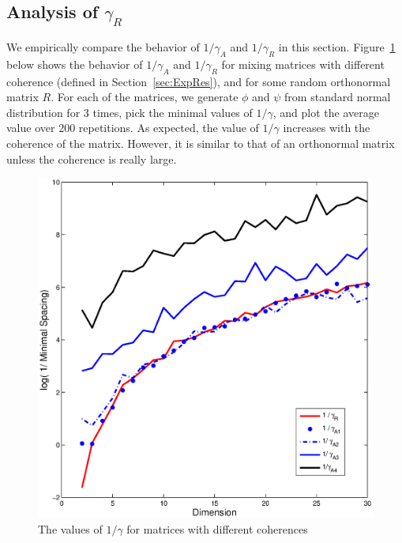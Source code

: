 \documentclass[twoside,11pt]{article}
\begin{document}
\subsection{Analysis of $\gamma_R$}
\label{sec:gamma}
We empirically compare the behavior of $1/\gamma_A$ and $1/\gamma_R$ in this section.
Figure~\ref{fig:miniSpacing} below shows the behavior of $1/\gamma_A$ and $1/\gamma_R$ for mixing matrices with different coherence (defined in Section~\ref{sec:ExpRes}), and for some random orthonormal matrix $R$. For each of the matrices, we generate $\phi$ and $\psi$ from standard normal distribution for 3 times, pick the minimal values of $1/\gamma$, and plot the average value over 200 repetitions. %
As expected, the value of $1/\gamma$ increases with the coherence of the matrix. However, it is similar to that of an orthonormal matrix unless the coherence is really large. 
\begin{figure}[h]
\centering
	\includegraphics[width = 0.75\columnwidth]{miniSpacing}
\caption{
\label{fig:miniSpacing}
 The values of $1/\gamma$ for matrices with different coherences}
\end{figure}

\end{document}
